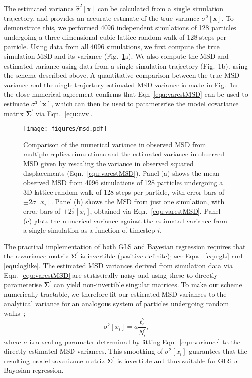 \documentclass[reprint,superscriptaddress,nobibnotes,amsmath,amssymb,aps,prx,hidelinks]{revtex4-2}
\newcommand{\oMSD}{\ensuremath{\bm{x}}}
\newcommand{\oMSDi}{\ensuremath{x_i}}
\newcommand{\nind}[1]{\ensuremath{N^\prime_{#1}}}
\newcommand{\var}[1]{\ensuremath{\sigma^2[#1]}}
\newcommand{\varest}[1]{\ensuremath{\widehat{\sigma}^2[#1]}}
\begin{document}
The estimated variance $\varest{\oMSD}$ can be calculated from a single simulation trajectory, and provides an accurate estimate of the true variance $\var{\oMSD}$.
To demonstrate this, we performed \num{4096} independent simulations of \num{128} particles undergoing a three-dimensional cubic-lattice random walk of \num{128} steps per particle.
Using data from all \num{4096} simulations, we first compute the true simulation MSD and its variance (Fig.~\ref{fig:msd}a).
We also compute the MSD and estimated variance using data from a single simulation trajectory (Fig.~\ref{fig:msd}b), using the scheme described above.
A quantitative comparison between the true MSD variance and the single-trajectory estimated MSD variance is made in Fig.~\ref{fig:msd}c: the close numerical agreement confirms that Eqn~\ref{equ:varestMSD} can be used to estimate $\var{\oMSD}$, which can then be used to parameterise the model covariance matrix $\mathbf{\Sigma^\prime}$ via Eqn.~\ref{equ:cvv}.
%
\begin{figure}
    \centering
    \texttt{[image: figures/msd.pdf]}
    \caption{
        Comparison of the numerical variance in observed MSD from multiple replica simulations and the estimated variance in observed MSD given by rescaling the variance in observed squared displacements (Eqn.~\ref{equ:varestMSD}).
        Panel (a) shows the mean observed MSD from \num{4096} simulations of \num{128} particles undergoing a 3D lattice random walk of \num{128} steps per particle, with error bars of $\pm2\sigma[\oMSDi]$.
        Panel (b) shows the MSD from just one simulation, with error bars of $\pm2\widehat{\sigma}[\oMSDi]$, obtained via Eqn.~\ref{equ:varestMSD}.
        Panel (c) plots the numerical variance against the estimated variance from a single simulation as a function of timestep $i$.
    }
    \label{fig:msd}
\end{figure}
%

The practical implementation of both GLS and Bayesian regression requires that the covariance matrix $\mathbf{\Sigma^\prime}$ is invertible (positive definite); see Eqns.~\ref{equ:gls} and \ref{equ:loglike}.
The estimated MSD variances derived from simulation data via Eqn.~\ref{equ:varestMSD} are statistically noisy and using these to directly parameterise $\mathbf{\Sigma^\prime}$ can yield non-invertible singular matrices.
To make our scheme numerically tractable, we therefore fit our estimated MSD variances to the analytical variance for an analogous system of particles undergoing random walks~\cite{smith_random_1996};
%
\begin{equation}
    \var{\oMSDi} = a\frac{t^2_i}{\nind{i}},
    \label{equ:variance}
\end{equation}
%
where $a$ is a scaling parameter determined by fitting Eqn.~\ref{equ:variance} to the directly estimated MSD variances.
This smoothing of $\var{\oMSDi}$ guarantees that the resulting model covariance matrix $\mathbf{\Sigma^\prime}$ is invertible and thus suitable for GLS or Bayesian regression.
\end{document}
